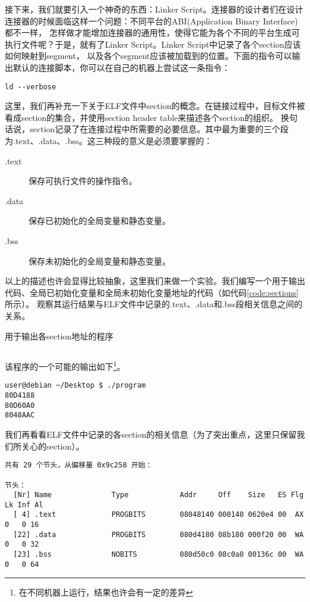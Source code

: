 接下来，我们就要引入一个神奇的东西：Linker Script。连接器的设计者们在设计连接器的时候面临这样一个问题：不同平台的ABI(Application Binary Interface)都不一样，
怎样做才能增加连接器的通用性，使得它能为各个不同的平台生成可执行文件呢？于是，就有了Linker Script。Linker Script中记录了各个section应该如何映射到segment，
以及各个segment应该被加载到的位置。下面的指令可以输出默认的连接脚本，你可以在自己的机器上尝试这一条指令：

\begin{verbatim}
ld --verbose
\end{verbatim}

这里，我们再补充一下关于ELF文件中section的概念。在链接过程中，目标文件被看成section的集合，并使用section header table来描述各个section的组织。
换句话说，section记录了在连接过程中所需要的必要信息。其中最为重要的三个段为.text、.data、.bss。这三种段的意义是必须要掌握的：

\begin{description}
  \item[.text] 保存可执行文件的操作指令。
  \item[.data] 保存已初始化的全局变量和静态变量。
  \item[.bss] 保存未初始化的全局变量和静态变量。
\end{description}

以上的描述也许会显得比较抽象，这里我们来做一个实验。我们编写一个用于输出代码、全局已初始化变量和全局未初始化变量地址的代码（如代码\ref{code:sections}所示）。
观察其运行结果与ELF文件中记录的.text、.data和.bss段相关信息之间的关系。

\begin{codeBoxWithCaption}{用于输出各section地址的程序\label{code:sections}}
  \inputminted[linenos]{c}{codes/sections.c}
\end{codeBoxWithCaption}

该程序的一个可能的输出如下\footnote{在不同机器上运行，结果也许会有一定的差异}。

\begin{verbatim}
user@debian ~/Desktop $ ./program 
80D4188
80D60A0
8048AAC
\end{verbatim}

我们再看看ELF文件中记录的各section的相关信息（为了突出重点，这里只保留我们所关心的section）。

\begin{verbatim}
共有 29 个节头，从偏移量 0x9c258 开始：

节头：
  [Nr] Name              Type            Addr     Off    Size   ES Flg Lk Inf Al
  [ 4] .text             PROGBITS        08048140 000140 0620e4 00  AX  0   0 16
  [22] .data             PROGBITS        080d4180 08b180 000f20 00  WA  0   0 32
  [23] .bss              NOBITS          080d50c0 08c0a0 00136c 00  WA  0   0 64
\end{verbatim}

